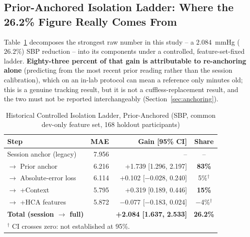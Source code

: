 \documentclass[journal]{IEEEtran}
\begin{document}
\subsection{Prior-Anchored Isolation Ladder: Where the 26.2\% Figure Really Comes From}
\label{sec:v21}
Table~\ref{tab:v21} decomposes the strongest raw number in this study -- a $2.084$~mmHg ($26.2\%$) SBP reduction -- into its components under a controlled, feature-set-fixed ladder. \textbf{Eighty-three percent of that gain is attributable to re-anchoring alone} (predicting from the most recent prior reading rather than the session calibration), which on an in-lab protocol can mean a reference only minutes old; this is a genuine tracking result, but it is not a cuffless-replacement result, and the two must not be reported interchangeably (Section~\ref{sec:anchoring}).
\begin{table}[t]
\centering
\caption{Historical Controlled Isolation Ladder, Prior-Anchored (SBP, common dev-only feature set, 168 holdout participants)}
\label{tab:v21}
\begin{tabular}{lrrc}
\toprule
Step & MAE & Gain [95\% CI] & Share \\
\midrule
Session anchor (legacy) & 7.956 & -- & -- \\
$\rightarrow$ Prior anchor & 6.216 & +1.739 [1.296, 2.197] & \textbf{83\%} \\
$\rightarrow$ Absolute-error loss & 6.114 & +0.102 [$-$0.028, 0.240] & 5\%$^\dagger$ \\
$\rightarrow$ +Context & 5.795 & +0.319 [0.189, 0.446] & \textbf{15\%} \\
$\rightarrow$ +HCA features & 5.872 & $-$0.077 [$-$0.183, 0.024] & $-$4\%$^\dagger$ \\
\midrule
\textbf{Total (session $\rightarrow$ full)} & & \textbf{+2.084 [1.637, 2.533]} & \textbf{26.2\%} \\
\bottomrule
\multicolumn{4}{l}{\footnotesize $^\dagger$ CI crosses zero: not established at 95\%.}
\end{tabular}
\end{table}
\end{document}
